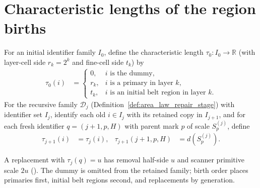 \section{Characteristic lengths of the region births}
\label{sec:area_law_repair_lengths}

\begin{definition}
    \label{def:area_law_repair_characteristic_length}
    \leanok
    For an initial identifier family $I_0$, define the characteristic length
    $\tau_0:I_0\to\mathbb R$ (with layer-cell side $r_k=2^k$ and fine-cell side $t_k$) by
    \begin{align}
        \tau_0(i) & =
        \begin{cases}
            0,   & i\text{ is the dummy},                         \\
            r_k, & i\text{ is a primary in layer }k,              \\
            t_k, & i\text{ is an initial belt region in layer }k.
        \end{cases}
        \label{eq:area_law_initial_characteristic_length}
    \end{align}
    For the recursive family $\mathcal D_j$ (Definition~\ref{def:area_law_repair_stage}) with
    identifier set $I_j$, identify each old $i\in I_j$ with its retained copy in $I_{j+1}$,
    and for each fresh identifier $q=(j+1,p,H)$ with parent mark $p$ of scale $S_p^{(j)}$, define
    \begin{align}
        \tau_{j+1}(i)       & =\tau_j(i),    &
        \tau_{j+1}(j+1,p,H) & =d(S_p^{(j)}).
        \label{eq:area_law_repair_characteristic_length}
    \end{align}
\end{definition}

A replacement with $\tau_j(q)=u$ has removal half-side $u$ and scanner primitive scale $2u$
(\cite[Section~11]{OpenAI2026AreaLaw}). The dummy is omitted from the retained family; birth order
places primaries first, initial belt regions second, and replacements by generation.

